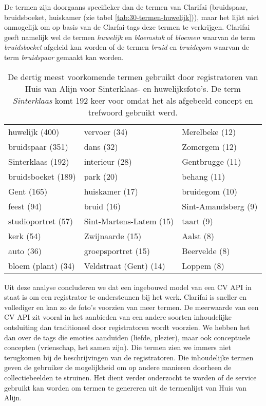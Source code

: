De termen zijn doorgaans specifieker dan de termen van Clarifai (bruidspaar, bruidsboeket, huiskamer (zie tabel \ref{tab:30-termen-huwelijk})), maar het lijkt niet onmogelijk om op basis van de Clarfai-tags deze termen te verkrijgen. Clarifai geeft namelijk wel de termen \textit{huwelijk} en \textit{bloemstuk} of \textit{bloemen} waarvan de term \textit{bruidsboeket} afgeleid kan worden of de termen \textit{bruid} en \textit{bruidegom} waarvan de term \textit{bruidspaar} gemaakt kan worden.

\begin{table}
	\centering
	\begin{tabular}{*{3}{l}}
		huwelijk (400) & vervoer (34) & Merelbeke (12) \\
		bruidspaar (351) & dans (32) & Zomergem (12) \\
		Sinterklaas (192) & interieur (28) & Gentbrugge (11) \\
		bruidsboeket (189) & park (20) & behang (11) \\
		Gent (165) & huiskamer (17) & bruidegom (10) \\
		feest (94) & bruid (16) & Sint-Amandsberg (9) \\
		studioportret (57) & Sint-Martens-Latem (15) & taart (9) \\
		kerk (54) & Zwijnaarde (15) & Aalst (8) \\
		auto (36) & groepsportret (15) & Beervelde (8) \\
		bloem (plant) (34) & Veldstraat (Gent) (14) & Loppem (8) \\
	\end{tabular}
	\caption[De dertig meest voorkomende termen gebruikt door registratoren van Huis van Alijn]{De dertig meest voorkomende termen gebruikt door registratoren van Huis van Alijn voor Sinterklaas- en huwelijksfoto's. De term \textit{Sinterklaas} komt 192 keer voor omdat het als afgebeeld concept en trefwoord gebruikt werd.}
	\label{tab:30-termen-HvA}
\end{table}

Uit deze analyse concluderen we dat een ingebouwd model van een CV API in staat is om een registrator te ondersteunen bij het werk. Clarifai is sneller en vollediger en kan zo de foto's voorzien van meer termen. De meerwaarde van een CV API zit vooral in het aanbieden van een andere soorten inhoudelijke ontsluiting dan traditioneel door registratoren wordt voorzien. We hebben het dan over de tags die emoties aanduiden (liefde, plezier), maar ook conceptuele concepten (vrienschap, het samen zijn). Die termen zien we immers niet terugkomen bij de beschrijvingen van de registratoren. Die inhoudelijke termen geven de gebruiker de mogelijkheid om op andere manieren doorheen de collectiebeelden te struinen. Het dient verder onderzocht te worden of de service gebruikt kan worden om termen te genereren uit de termenlijst van Huis van Alijn. 


